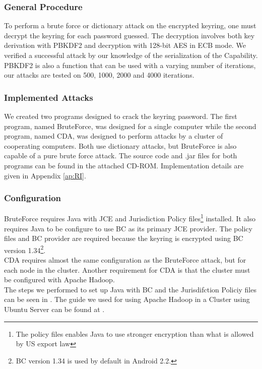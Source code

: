 \documentclass[pdftex,english,10pt,b5paper,twoside]{book}
\begin{document}
\subsubsection{General Procedure} To perform a brute force or dictionary attack
on the encrypted keyring, one must decrypt the keyring for each password
guessed. The decryption involves both key derivation with \ac{PBKDF2} and
decryption with 128-bit \ac{AES} in \ac{ECB} mode. We verified a successful
attack by our knowledge of the serialization of the Capability. \ac{PBKDF2} is
also a function that can be used with a varying number of iterations, our
attacks are tested on 500, 1000, 2000 and 4000 iterations.

\subsubsection{Implemented Attacks} We created two programs designed to crack
the keyring password. The first program, named BruteForce, was designed for a
single computer while the second program, named \ac{CDA}, was designed to
perform attacks by a cluster of cooperating computers. Both use dictionary
attacks, but BruteForce is also capable of a pure brute force attack. The
source code and .jar files for both programs can be found in the attached
CD-ROM. Implementation details are given in Appendix \ref{ap:RI}.

\subsubsection{Configuration} BruteForce requires Java with \ac{JCE} and
Jurisdiction Policy files\footnote{The policy files enables Java to use
stronger encryption than what is allowed by US export law} installed.  It also
requires Java to be configure to use \ac{BC} as its primary \ac{JCE} provider.
The policy files and \ac{BC} provider are required because the keyring is
encrypted using BC version 1.34\footnote{BC version 1.34 is used by default in
Android 2.2.}.\\

\noindent \ac{CDA} requires almost the same configuration as the BruteForce
attack, but for each node in the cluster. Another requirement for
\ac{CDA} is that the cluster must be configured with Apache Hadoop.\\

\noindent The steps we performed to set up Java with \ac{BC} and the
Jurisdifction Policiy files can be seen in \cite{jce+bc}. The guide we used for
using Apache Hadoop in a Cluster using Ubuntu Server can be found at
\cite{cluster}.
\end{document}
